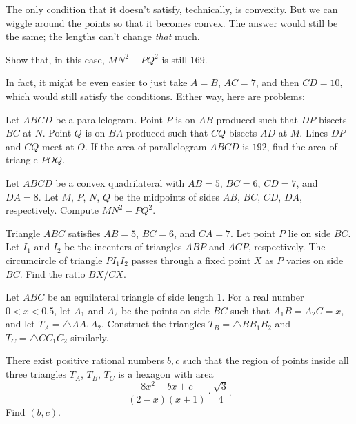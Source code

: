 \documentclass[11pt,paper=letter]{scrartcl}
\begin{document}
The only condition that it doesn't satisfy, technically, is convexity. But we can wiggle around the points so that it becomes convex. The answer would still be the same; the lengths can't change \textit{that} much.

\begin{exrboxed}
  Show that, in this case, $MN^2 + PQ^2$ is still $169$.
\end{exrboxed}

In fact, it might be even easier to just take $A = B$, $AC = 7$, and then $CD = 10$, which would still satisfy the conditions. Either way, here are problems:

\begin{mdframed}[style=exmdbox]

\begin{problem}[AIMO 2019/6]
  Let $ABCD$ be a parallelogram. Point $P$ is on $AB$ produced such that $DP$ bisects $BC$ at $N$. Point $Q$ is on $BA$ produced such that $CQ$ bisects $AD$ at $M$. Lines $DP$ and $CQ$ meet at $O$. If the area of parallelogram $ABCD$ is $192$, find the area of triangle $POQ$.
\end{problem}

\begin{problem}
  Let $ABCD$ be a convex quadrilateral with $AB = 5$, $BC = 6$, $CD = 7$, and $DA = 8$. Let $M$, $P$, $N$, $Q$ be the midpoints of sides $AB$, $BC$, $CD$, $DA$, respectively. Compute $MN^2 - PQ^2$.
\end{problem}

\begin{problem}
  Triangle $ABC$ satisfies $AB = 5$, $BC = 6$, and $CA = 7$. Let point $P$ lie on side $BC$. Let $I_1$ and $I_2$ be the incenters of triangles $ABP$ and $ACP$, respectively. The circumcircle of triangle $PI_1I_2$ passes through a fixed point $X$ as $P$ varies on side $BC$. Find the ratio $BX/CX$. \hint{\ref{h:9}}
\end{problem}

\newpage
\phantom{.}
\vspace{-3pt}

\begin{problem}
  Let $ABC$ be an equilateral triangle of side length $1$. For a real number $0 < x < 0.5$, let $A_1$ and $A_2$ be the points on side $BC$ such that $A_1B = A_2C = x$, and let $T_A = \triangle AA_1A_2$. Construct the triangles $T_B = \triangle BB_1B_2$ and $T_C = \triangle CC_1C_2$ similarly.

  There exist positive rational numbers $b, c$ such that the region of points inside all three triangles $T_A$, $T_B$, $T_C$ is a hexagon with area
  $$\frac{8x^2 - bx + c}{(2-x)(x+1)} \cdot \frac{\sqrt3}{4}.$$
  Find $(b, c)$.
\end{problem}

\end{mdframed}
\end{document}

